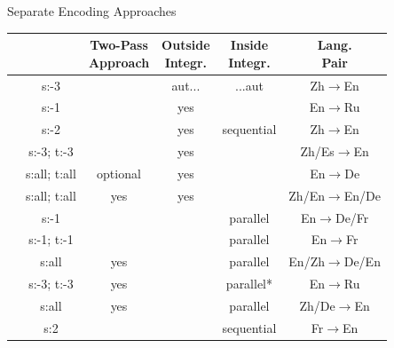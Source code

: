 \begin{frame}{Separate Encoding Approaches}\label{slide:separateencoding}
	\begin{table}
		\begin{tabular}{ *{5}{c|} c }

			\thead{Reference}
			& \thead{Context}
					& \thead{Two-Pass\\ Approach}
						& \thead{Outside\\ Integr.}
							& \thead{Inside\\ Integr.}
								& \thead{Lang.\\ Pair}
									 \\
			\hline\hline
			\cite{wang_exploiting_2017}&s:-3 &&aut...&...aut&Zh$\to$En\\
			\hline
			\cite{voita_context-aware_2018}&s:-1&&yes&&En$\to$Ru\\
			\hline
			\cite{zhang_improving_2018}&s:-2&&yes&sequential&Zh$\to$En\\
			\hline
			\cite{miculicich_document-level_2018}&s:-3; t:-3&&yes&&Zh/Es$\to$En\\
			\hline
			\cite{maruf_selective_2019}&s:all; t:all&optional&yes&&En$\to$De\\
			\hline
			\cite{zheng_toward_2020}&s:all; t:all&yes&yes&&Zh/En$\to$En/De\\
			\hline
			\cite{jean_does_2017}&s:-1&&&parallel&En$\to$De/Fr\\
			\hline
			\cite{bawden_evaluating_2018}&s:-1; t:-1&&&parallel&En$\to$Fr\\
			\hline
			\cite{fu_reference_2019}&s:all&yes&&parallel&En/Zh$\to$De/En\\
			\hline
			\cite{voita_when_2019}&s:-3; t:-3&yes&&parallel*&En$\to$Ru\\
			\hline
			\cite{tan_hierarchical_2019}&s:all&yes&&parallel&Zh/De$\to$En\\
			\hline
			\cite{wang_improving_2019} &s:2&&&sequential&Fr$\to$En\\
			\hline
		\end{tabular}
	\end{table}
\end{frame}

